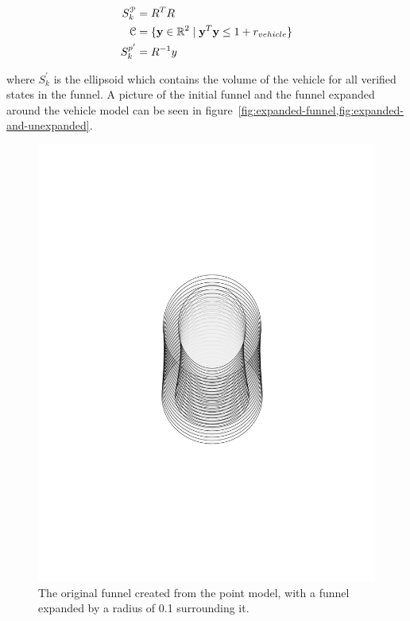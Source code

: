 \begin{align*}
  S_{k}^{\mathcal{P}} &= R^{T}R \\
  \mathcal{C} &= \lbrace\mathbf{y} \in \mathbb{R}^2 \mid \mathbf{y}^{T}\mathbf{y} \leq 1 + r_{vehicle}\rbrace \\
  S_{k}^{p'} &= R^{-1}y \\
\end{align*}

where \(S_{k}^{'}\) is the ellipsoid which contains the volume of the vehicle
for all verified states in the funnel. A picture of the initial funnel and the
funnel expanded around the vehicle model can be seen in
figure~\cref{fig:expanded-funnel,fig:expanded-and-unexpanded}.

\begin{figure}
  \centering \includegraphics[clip, trim=6cm 8cm 6cm 8cm,
  scale=.5]{figures/method/expanded-funnel}
  \caption{The original funnel created from the point model, with a funnel
    expanded by a radius of 0.1 surrounding it.}
  \label{fig:expanded-funnel}
\end{figure}

